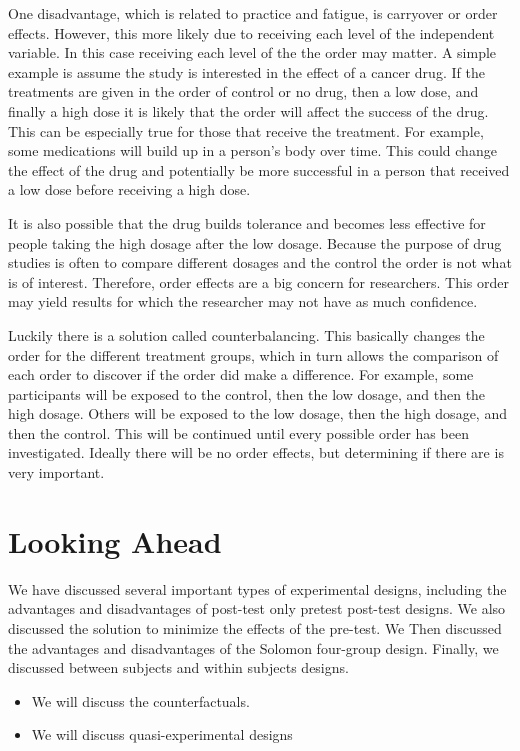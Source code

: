\documentclass[]{book}
\theoremstyle{definition}
\theoremstyle{definition}
\theoremstyle{definition}
\theoremstyle{remark}
\begin{document}
One disadvantage, which is related to practice and fatigue, is carryover
or order effects. However, this more likely due to receiving each level
of the independent variable. In this case receiving each level of the
the order may matter. A simple example is assume the study is interested
in the effect of a cancer drug. If the treatments are given in the order
of control or no drug, then a low dose, and finally a high dose it is
likely that the order will affect the success of the drug. This can be
especially true for those that receive the treatment. For example, some
medications will build up in a person's body over time. This could
change the effect of the drug and potentially be more successful in a
person that received a low dose before receiving a high dose.

It is also possible that the drug builds tolerance and becomes less
effective for people taking the high dosage after the low dosage.
Because the purpose of drug studies is often to compare different
dosages and the control the order is not what is of interest. Therefore,
order effects are a big concern for researchers. This order may yield
results for which the researcher may not have as much confidence.

Luckily there is a solution called counterbalancing. This basically
changes the order for the different treatment groups, which in turn
allows the comparison of each order to discover if the order did make a
difference. For example, some participants will be exposed to the
control, then the low dosage, and then the high dosage. Others will be
exposed to the low dosage, then the high dosage, and then the control.
This will be continued until every possible order has been investigated.
Ideally there will be no order effects, but determining if there are is
very important.

\hypertarget{looking-ahead-12}{%
\section{Looking Ahead}\label{looking-ahead-12}}

We have discussed several important types of experimental designs,
including the advantages and disadvantages of post-test only pretest
post-test designs. We also discussed the solution to minimize the
effects of the pre-test. We Then discussed the advantages and
disadvantages of the Solomon four-group design. Finally, we discussed
between subjects and within subjects designs.

\begin{itemize}
\item
  We will discuss the counterfactuals.
\item
  We will discuss quasi-experimental designs
\end{itemize}
\end{document}
